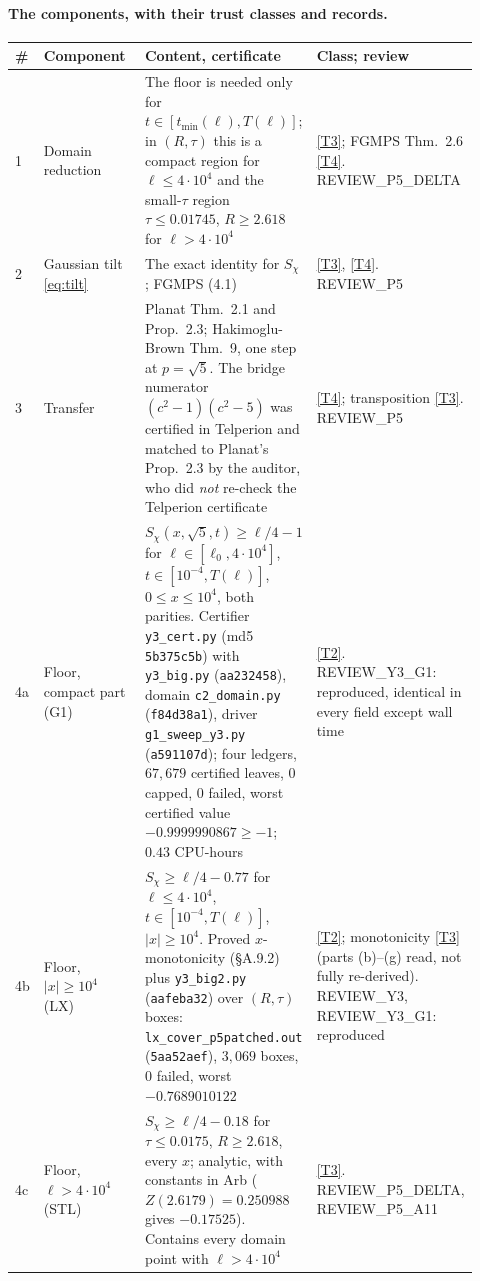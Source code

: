 \documentclass[11pt]{article}
\theoremstyle{definition}
\newcommand{\lean}[1]{\texttt{#1}}
\begin{document}
\paragraph{The components, with their trust classes and records.}\label{sec:v2trust}
\begin{center}\small
\begin{longtable}{@{}P{0.04\linewidth}P{0.30\linewidth}P{0.36\linewidth}P{0.22\linewidth}@{}}
\toprule
\# & Component & Content, certificate & Class; review \\
 & Domain reduction & The floor is needed only for $t \in [t_{\min}(\ell), T(\ell)]$; in $(R,\tau)$ this is a compact region for $\ell \le 4\cdot10^4$ and the small-$\tau$ region $\tau \le 0.01745$, $R \ge 2.618$ for $\ell > 4\cdot10^4$ \cite[P5 memo \S A.9.0]{dq1records} & \ref{T3}; FGMPS Thm.~2.6 \ref{T4}. REVIEW\_P5\_DELTA \\
2 & Gaussian tilt \eqref{eq:tilt} & The exact identity for $S_\chi$; FGMPS (4.1) & \ref{T3}, \ref{T4}. REVIEW\_P5 \\
3 & Transfer & Planat Thm.~2.1 and Prop.~2.3; Hakimoglu-Brown Thm.~9, one step at $p = \sqrt5$. The bridge numerator $(c^2-1)(c^2-5)$ was certified in Telperion and matched to Planat's Prop.~2.3 by the auditor, who did \emph{not} re-check the Telperion certificate & \ref{T4}; transposition \ref{T3}. REVIEW\_P5 \\
4a & Floor, compact part (G1) & $S_\chi(x,\sqrt5,t) \ge \ell/4 - 1$ for $\ell \in [\ell_0, 4\cdot10^4]$, $t \in [10^{-4}, T(\ell)]$, $0 \le x \le 10^4$, both parities. Certifier \lean{y3\_cert.py} (md5 \lean{5b375c5b}) with \lean{y3\_big.py} (\lean{aa232458}), domain \lean{c2\_domain.py} (\lean{f84d38a1}), driver \lean{g1\_sweep\_y3.py} (\lean{a591107d}); four ledgers, $67{,}679$ certified leaves, $0$ capped, $0$ failed, worst certified value $-0.9999990867 \ge -1$; $0.43$ CPU-hours & \ref{T2}. REVIEW\_Y3\_G1: reproduced, identical in every field except wall time \\
4b & Floor, $|x| \ge 10^4$ (LX) & $S_\chi \ge \ell/4 - 0.77$ for $\ell \le 4\cdot10^4$, $t \in [10^{-4}, T(\ell)]$, $|x| \ge 10^4$. Proved $x$-monotonicity (\S A.9.2) plus \lean{y3\_big2.py} (\lean{aafeba32}) over $(R,\tau)$ boxes: \lean{lx\_cover\_p5patched.out} (\lean{5aa52aef}), $3{,}069$ boxes, $0$ failed, worst $-0.7689010122$ & \ref{T2}; monotonicity \ref{T3} (parts (b)--(g) read, not fully re-derived). REVIEW\_Y3, REVIEW\_Y3\_G1: reproduced \\
4c & Floor, $\ell > 4\cdot10^4$ (STL) & $S_\chi \ge \ell/4 - 0.18$ for $\tau \le 0.0175$, $R \ge 2.618$, every $x$; analytic, with constants in Arb ($Z(2.6179) = 0.250988$ gives $-0.17525$). Contains every domain point with $\ell > 4\cdot10^4$ & \ref{T3}. REVIEW\_P5\_DELTA, REVIEW\_P5\_A11 \\

\end{longtable}
\end{center}
\end{document}

